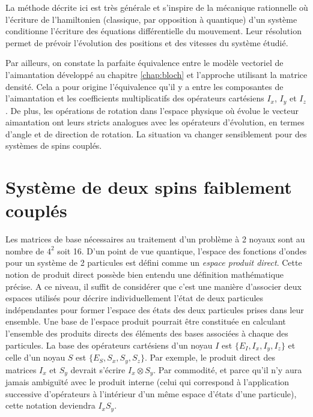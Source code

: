 La méthode décrite ici est très générale et s'inspire de la mécanique rationnelle
où l'écriture de l'hamiltonien (classique, par opposition à quantique) d'un système
conditionne l'écriture des équations différentielle du mouvement.
Leur résolution permet de prévoir l'évolution des positions et des vitesses
du système étudié.

Par ailleurs, on constate la parfaite équivalence entre le modèle vectoriel
de l'aimantation développé au chapitre \ref{chap:bloch} et 
l'approche utilisant la matrice densité.
Cela a pour origine l'équivalence qu'il y a entre les composantes de l'aimantation
et les coefficients multiplicatifs des opérateurs cartésiens $I_x$, $I_y$ et $I_z$.
De plus, les opérations de rotation dans l'espace physique où évolue le vecteur
aimantation ont leurs stricts analogues avec les opérateurs d'évolution, en termes
d'angle et de direction de rotation.
La situation va changer sensiblement pour des systèmes de spins couplés.

\section{Système de deux spins faiblement couplés}

Les matrices de base nécessaires au traitement d'un problème à 2 noyaux sont au 
nombre de $4^2$ soit 16.
D'un point de vue quantique, l'espace des fonctions d'ondes pour un système
de 2 particules est défini comme un \emph{espace produit direct}.
Cette notion de produit direct possède bien entendu une définition mathématique précise.
A ce niveau, il suffit de considérer que c'est une manière d'associer
deux espaces utilisés pour décrire individuellement l'état de deux particules
indépendantes pour former l'espace des états des deux particules prises dans leur ensemble.
Une base de l'espace produit pourrait être constituée en calculant l'ensemble des 
produits directs des éléments des bases associées à chaque des particules.
La base des opérateurs cartésiens d'un noyau $I$ est $\{E_I, I_x, I_y, I_z\}$ et celle
d'un noyau $S$ est $\{E_S, S_x, S_y, S_z\}$.
Par exemple, le produit direct des matrices $I_x$ et $S_y$ devrait s'écrire $I_x \otimes S_y$.
Par commodité, et parce qu'il n'y aura jamais ambiguïté avec le produit interne (celui
qui correspond à l'application successive d'opérateurs à l'intérieur d'un même
espace d'états d'une particule), cette notation deviendra $I_xS_y$.


